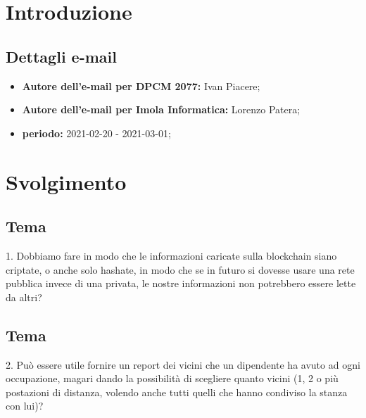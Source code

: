 \section*{Introduzione}
\subsection*{Dettagli e-mail}
\begin{itemize}
	\item \textbf{Autore dell'e-mail per DPCM 2077:} Ivan Piacere;
	\item \textbf{Autore dell'e-mail per Imola Informatica:} Lorenzo Patera;
	\item \textbf{periodo:} 2021-02-20 - 2021-03-01;
\end{itemize}

\section*{Svolgimento}



\subsection*{Tema}
1. Dobbiamo fare in modo che le informazioni caricate sulla blockchain siano criptate, o anche solo hashate, in modo che se in futuro si dovesse usare una rete pubblica invece di una privata, le nostre informazioni non potrebbero essere lette da altri?

\subsection*{Tema}
2. Può essere utile fornire un report dei vicini che un dipendente ha avuto ad ogni occupazione, magari dando la possibilità di scegliere quanto vicini (1, 2 o più postazioni di distanza, volendo anche tutti quelli che hanno condiviso la stanza con lui)?

